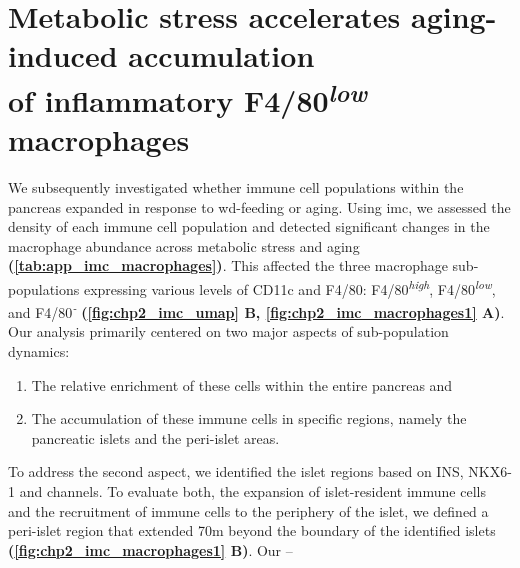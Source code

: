 \section[Metabolic stress accelerates aging-induced accumulation of inflammatory F4/80\textsuperscript{\textit{low}} macrophages]{Metabolic stress accelerates aging-induced accumulation \\of inflammatory F4/80\textsuperscript{\textit{low}} macrophages}
\label{sec:imc_acceleration}

We subsequently investigated whether immune cell populations within the pancreas expanded in response to \gls{wd}-feeding or aging. Using \gls{imc}, we assessed the density of each immune cell population and detected significant changes in the macrophage abundance across metabolic stress and aging \textbf{(\autoref{tab:app_imc_macrophages})}. This affected the three macrophage sub-populations expressing various levels of CD11c and F4/80: F4/80\textsuperscript{\textit{high}}, F4/80\textsuperscript{\textit{low}}, and F4/80\textsuperscript{\textit{-}} \textbf{(\autoref{fig:chp2_imc_umap} B, \autoref{fig:chp2_imc_macrophages1} A)}. Our analysis primarily centered on two major aspects of sub-population dynamics: 
\begin{enumerate}
    \item The relative enrichment of these cells within the entire pancreas and
    \item The accumulation of these immune cells in specific regions, namely the pancreatic islets and the peri-islet areas.
\end{enumerate}

To address the second aspect, we identified the islet regions based on INS, NKX6-1 and  channels. To evaluate both, the expansion of islet-resident immune cells and the recruitment of immune cells to the periphery of the islet, we defined a peri-islet region that extended 70\textmu m beyond the boundary of the identified islets \textbf{(\autoref{fig:chp2_imc_macrophages1} B)}. Our --


